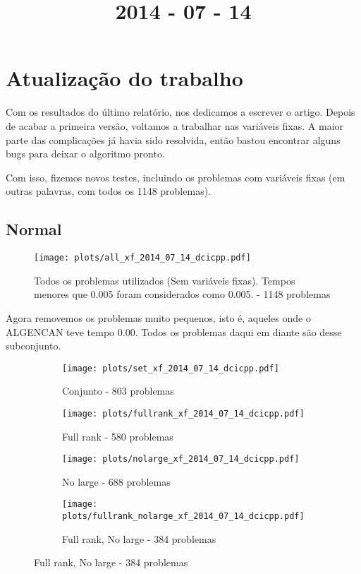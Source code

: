 \documentclass{article}
\title{2014 - 07 - 14}
\author{}
\date{}
\begin{document}
\maketitle
\section{Atualização do trabalho}

Com os resultados do último relatório, nos dedicamos a escrever o
artigo. Depois de acabar a primeira versão, voltamos a trabalhar nas
variáveis fixas. A maior parte das complicações já havia sido
resolvida, então bastou encontrar alguns bugs para deixar o algoritmo
pronto.

Com isso, fizemos novos testes, incluindo os problemas com variáveis
fixas (em outras palavras, com todos os 1148 problemas).

\subsection{Normal}

\begin{figure}[H]
  \centering
  \texttt{[image: plots/all\_xf\_2014\_07\_14\_dcicpp.pdf]}
  \caption{Todos os problemas utilizados (Sem variáveis fixas). Tempos
    menores que 0.005 foram considerados como 0.005. - 1148 problemas}
\end{figure}
Agora removemos os problemas muito pequenos, isto é, aqueles onde o
ALGENCAN teve tempo 0.00. Todos os problemas daqui em diante são desse
subconjunto.

\begin{figure}[H]
  \centering
  \begin{subfigure}{0.48\textwidth}
    \texttt{[image: plots/set\_xf\_2014\_07\_14\_dcicpp.pdf]}
    \caption{Conjunto - 803 problemas}
  \end{subfigure}
  \begin{subfigure}{0.48\textwidth}
    \texttt{[image: plots/fullrank\_xf\_2014\_07\_14\_dcicpp.pdf]}
    \caption{Full rank - 580 problemas}
  \end{subfigure}
  \begin{subfigure}{0.48\textwidth}
    \texttt{[image: plots/nolarge\_xf\_2014\_07\_14\_dcicpp.pdf]}
    \caption{No large - 688 problemas}
  \end{subfigure}
  \begin{subfigure}{0.48\textwidth}
    \texttt{[image: plots/fullrank\_nolarge\_xf\_2014\_07\_14\_dcicpp.pdf]}
    \caption{Full rank, No large - 384 problemas}
  \end{subfigure}
\end{figure}
\end{document}
